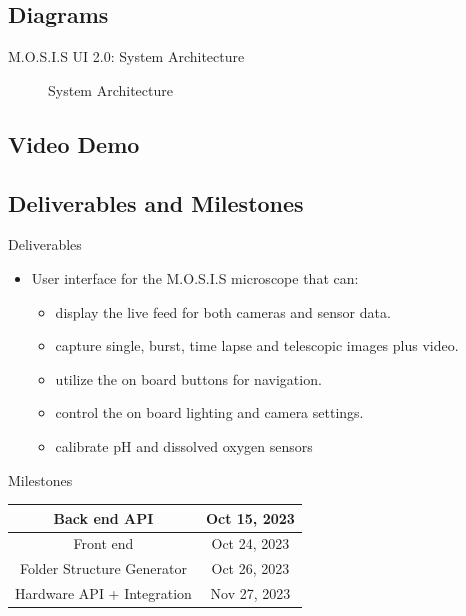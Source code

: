 \documentclass[17pt, aspectratio=169]{beamer}
\begin{document}
\subsection*{Diagrams}\begin{frame}{M.O.S.I.S UI 2.0: System Architecture}
	\begin{figure}
		\caption{System Architecture}
	\end{figure}
\end{frame}
\subsection{Video Demo}
\subsection*{Deliverables and Milestones}
\begin{frame}{Deliverables}
	\begin{itemize}
		\item User interface for the M.O.S.I.S microscope that can:
		      \begin{itemize}
			      \item display the live feed for both cameras and sensor data.
			      \item capture single, burst, time lapse and telescopic images plus video.
			      \item utilize the on board buttons for navigation.
			      \item control the on board lighting and camera settings.
			      \item calibrate pH and dissolved oxygen sensors
		      \end{itemize}
	\end{itemize}

\end{frame}
\begin{frame}{Milestones}
	\begin{center}
		\begin{tabular}{||c | c||}
			\hline
			Back end API               & Oct 15, 2023 \\
			\hline
			Front end                  & Oct 24, 2023 \\
			\hline
			Folder Structure Generator & Oct 26, 2023 \\
			\hline
			Hardware API + Integration & Nov 27, 2023 \\
			\hline
		\end{tabular}
	\end{center}
\end{frame}
\end{document}
